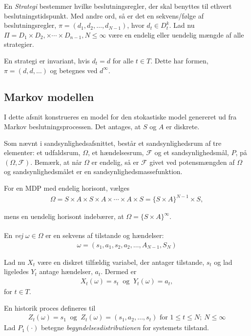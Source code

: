 En \textit{Strategi} bestemmer hvilke beslutningsregler, der skal benyttes til ethvert beslutningstidspunkt. Med andre ord, så er det en sekvens/følge af beslutningsregler, $\pi=(d_1,d_2,\dots,d_{N-1})$, hvor $d_t\in D_t^k$.
Lad nu $\Pi=D_1\times D_2,\times\cdots\times D_{n-1}, N\leq \infty$ være en endelig eller uendelig mængde af alle strategier.

En strategi er invariant, hvis $d_t=d$ for alle $t\in T$. Dette har formen, $\pi=(d,d,\dots)$ og betegnes ved $d^\infty$. 

\subsection{Markov modellen}

I dette afsnit konstrueres en model for den stokastiske model genereret ud fra Markov beslutningsprocessen. Det antages, at $S$ og $A$ er diskrete.

Som nævnt i sandsynlighedsafsnittet, består et sandsynlighedsrum af tre elementer: et udfaldsrum, $\Omega$, et hændelsesrum, $\mathcal{F}$ og et sandsynlighedsmål, $P$, på $(\Omega,\mathcal{F})$.
Bemærk, at når $\Omega$ er endelig, så er $\mathcal{F}$ givet ved potensmængden af $\Omega$ og sandsynlighedsmålet er en sandsynlighedsmassefunktion. 

For en MDP med endelig horisont, vælges
\begin{align*}
    \Omega=S\times A\times S\times A\times\cdots\times A\times S=\{S\times A\}^{N-1}\times S,
\end{align*}

mens en uendelig horisont indebærer, at $\Omega=\{S\times A\}^\infty$. \\\\
En \textit{vej} $\omega\in\Omega$ er en sekvens af tilstande og hændelser:
\begin{align*}
    \omega=(s_1,a_1,s_2,a_2,\dots,A_{N-1},S_N)
\end{align*}

Lad nu $X_t$ være en diskret tilfældig variabel, der antager tilstande, $s_t$ og lad ligeledes $Y_t$ antage hændelser, $a_t$. Dermed er 
\begin{align*}
    X_t(\omega)=s_t \ \text{ og } \ Y_t(\omega)=a_t,
\end{align*}
for $t\in T$. 

En historik proces defineres til
\begin{align*}
    Z_t(\omega)=s_1 \ \text{ og } \ Z_t(\omega)=(s_1,a_2,\dots,s_t) \text{ for } 1\leq t\leq N;\ N\leq \infty
\end{align*}
Lad $P_1(\cdot)$ betegne \textit{begyndelsesdistributionen} for systemets tilstand.



